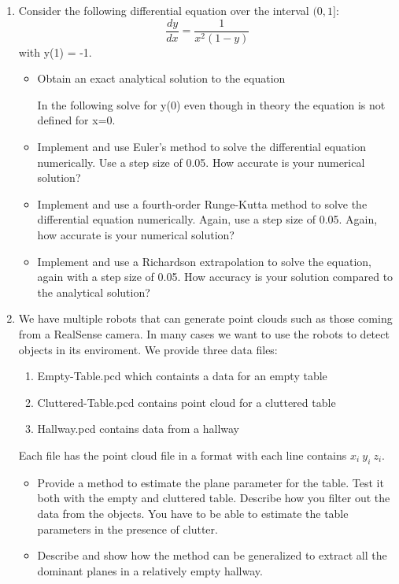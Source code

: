 \documentclass[12pt]{article}
\begin{document}
\begin{enumerate}
 
\item Consider the following differential equation over the interval
  $(0, 1]$:
\[
\frac{dy}{dx} = \frac{1}{x^2(1-y)}
\]
with y(1) = -1. 

\begin{itemize}
\item Obtain an exact analytical solution to the equation

In the following solve for y(0) even though in theory the equation is
not defined for x=0. 

\item Implement and use Euler’s method to solve the differential
  equation numerically. Use a step size of 0.05. How accurate is your
  numerical solution?

\item Implement and use a fourth-order Runge-Kutta method to solve the
  differential equation numerically. Again, use a step size of
  0.05. Again, how accurate is your numerical solution? 

\item Implement and use a Richardson extrapolation to solve the
  equation, again with a step size of 0.05. How accuracy is your
  solution compared to the analytical solution? 
\end{itemize}

\item We have multiple robots that can generate point clouds such as
  those coming from a RealSense camera. In many cases we want to use the 
  robots to detect objects in its enviroment. We provide three data
  files:
  \begin{enumerate}
  \item Empty-Table.pcd which containts a data for an empty table
  \item Cluttered-Table.pcd contains point cloud for a cluttered table
  \item Hallway.pcd contains data from a hallway
  \end{enumerate}
  Each file has the point cloud file in a format with each line
  contains $x_i ~ y_i ~ z_i$. 
  \begin{itemize}
  \item Provide a method to estimate the plane parameter for the
    table. Test it both with the empty and cluttered table. Describe
    how you filter out the data from the objects. You have to be able
    to estimate the table parameters in the presence of clutter. 
  \item Describe and show how the method can be generalized to extract
    all the dominant planes in a relatively empty hallway. 
  \end{itemize}
\end{enumerate}
\end{document}
